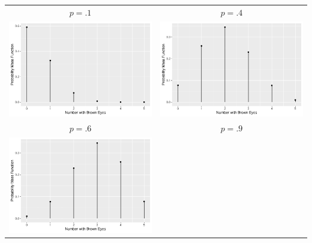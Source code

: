 \begin{frame}
  \begin{block}{\examplectd}
    \begin{center}
      \begin{tabular}{cc}
        $p=.1$ & $p=.4$\\
        \includegraphics[height=.32\textheight]{figure/example-10-1-5-1} &
                                                                           \includegraphics[height=.32\textheight]{figure/example-10-1-5-2} \\
        $p=.6$ & $p=.9$\\
        \includegraphics[height=.32\textheight]{figure/example-10-1-5-3} &

\end{tabular}
\end{center}
\end{block}
\end{frame}
